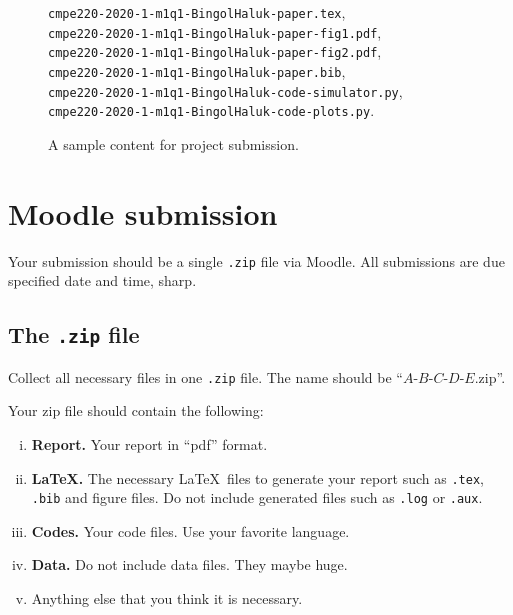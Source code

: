 \documentclass[11pt,a4,twocolumn]{article}
\newcommand{\hCode}[1]{\texttt{#1}}
\theoremstyle{plain}
\theoremstyle{definition}
\theoremstyle{remark}
\begin{document}
\begin{figure}[!tbp]
	\centering 
	\hCode{cmpe220-2020-1-m1q1-BingolHaluk-paper.tex},\\
	\hCode{cmpe220-2020-1-m1q1-BingolHaluk-paper-fig1.pdf},\\
	\hCode{cmpe220-2020-1-m1q1-BingolHaluk-paper-fig2.pdf},\\
	\hCode{cmpe220-2020-1-m1q1-BingolHaluk-paper.bib},\\
	\hCode{cmpe220-2020-1-m1q1-BingolHaluk-code-simulator.py},\\
	\hCode{cmpe220-2020-1-m1q1-BingolHaluk-code-plots.py}.
	\caption{
		A sample content for project submission.
	} 
	\label{fig:sampleContent}
\end{figure}




\section{Moodle submission}

Your submission should be a single \hCode{.zip} file via Moodle.
All submissions are due 
specified date and time, sharp.




\subsection{The \hCode{.zip} file}

Collect all necessary files in one \hCode{.zip} file.
The name should be ``$A$-$B$-$C$-$D$-$E$.zip''. 

Your zip file should contain the following:
\begin{enumerate}[i.]
	
	\item 
	\textbf{Report.}
	Your report in ``pdf'' format.
	
	\item
	\textbf{\LaTeX.}
	The necessary \LaTeX\ files to generate your report
	such as  
	\hCode{.tex}, 
	\hCode{.bib} and
	figure files.
	Do not include generated files such as \hCode{.log} or \hCode{.aux}.
		
	\item
	\textbf{Codes.}
	Your code files. 
	Use your favorite language.
	
	\item
	\textbf{Data.}
	Do not include data files.
	They maybe huge.
	
	\item
	Anything else that you think it is necessary.
	
\end{enumerate}






%
\end{document}
